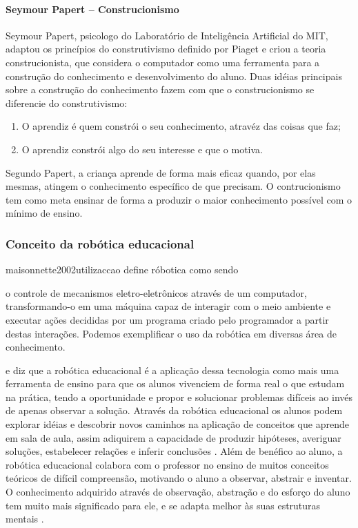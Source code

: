 \paragraph{Seymour Papert – Construcionismo}
Seymour Papert, psicologo do Laboratório de Inteligência Artificial do MIT, adaptou os princípios do construtivismo definido por Piaget e criou a teoria construcionista, que considera o computador como uma ferramenta para a construção do conhecimento e desenvolvimento do aluno. Duas idéias principais sobre a construção do conhecimento fazem com que o construcionismo se diferencie do construtivismo:
\begin{enumerate}
\item O aprendiz é quem constrói o seu conhecimento, atravéz das coisas que faz;
\item O aprendiz constrói algo do seu interesse e que o motiva. 
\end{enumerate} 
Segundo Papert, a criança aprende de forma mais eficaz quando, por elas mesmas, atingem o conhecimento específico de que precisam. O contrucionismo tem como meta ensinar de forma a produzir o maior conhecimento possível com o mínimo de ensino.

\subsubsection{Conceito da robótica educacional}
maisonnette2002utilizaccao define róbotica como sendo
\begin{citacao}
o controle de mecanismos eletro-eletrônicos através de um computador, 
transformando-o em uma máquina capaz de interagir com o meio ambiente e executar 
ações decididas por um programa criado pelo programador a partir destas interações. 
Podemos exemplificar o uso da robótica em diversas área de conhecimento.
\end{citacao}
e diz que a robótica educacional é a aplicação dessa tecnologia como mais uma ferramenta de ensino para que os alunos vivenciem de forma real o que estudam na prática, tendo a oportunidade e propor e solucionar problemas difíceis ao invés de apenas observar a solução.
Através da robótica educacional os alunos podem explorar idéias e descobrir novos caminhos na aplicação de conceitos que aprende em sala de aula, assim adiquirem a capacidade de produzir hipóteses, averiguar soluções, estabelecer relações e inferir conclusões \cite{benitti2009experimentaccao}.
Além de benéfico ao aluno, a robótica educacional colabora com o professor no ensino de muitos conceitos teóricos de difícil compreensão, motivando o aluno a observar, abstrair e inventar. O conhecimento adquirido através de observação, abstração e do esforço do aluno tem muito mais significado para ele, e se adapta melhor às suas estruturas mentais \cite{zilli2004robotica}.

